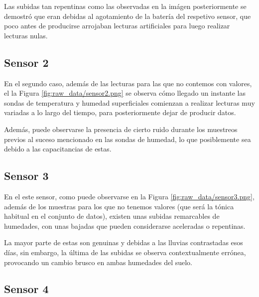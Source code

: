 Las subidas tan repentinas como las observadas en la imágen posteriormente se demostró
que eran debidas al agotamiento de la batería del respetivo sensor, que poco antes
de producirse arrojaban lecturas artificiales para luego realizar lecturas nulas.

\subsection{Sensor 2}


En el segundo caso, además de las lecturas para las que no contemos con valores,
el la Figura \ref{fig:raw_data/sensor2.png} se observa cómo llegado un instante
las sondas de temperatura y humedad superficiales comienzan a realizar lecturas
muy variadas a lo largo del tiempo, para posteriormente dejar de producir datos.

Además, puede observarse la presencia de cierto ruido durante los muestreos previos
al suceso mencionado en las sondas de humedad, lo que posiblemente sea debido a 
las capacitancias de estas.


\newpage
\subsection{Sensor 3}


En el este sensor, como puede observarse en la Figura \ref{fig:raw_data/sensor3.png},
además de los muestras para los que no tenemos valores (que será la tónica habitual
en el conjunto de datos), existen unas subidas remarcables de humedades, con unas
bajadas que pueden considerarse aceleradas o repentinas.

La mayor parte de estas son genuinas y debidas a las lluvias contrastadas esos días, sin 
embargo, la última de las subidas se observa contextualmente errónea, provocando 
un cambio brusco en ambas humedades del suelo.

\newpage
\subsection{Sensor 4}

